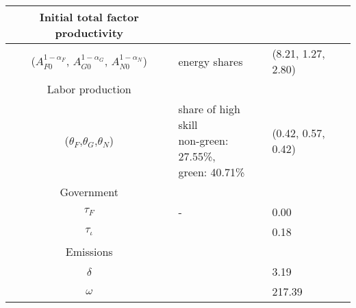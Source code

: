 \begin{table}[h!]
\begin{center}
{\begin{tabular}{c|ll}
 			\hline
 			Initial total factor productivity&\multicolumn{2}{c}{}\\
 			\hline
 			($A_{F0}^{1-\alpha_F}$, $A_{G0}^{1-\alpha_G}$, $A_{N0}^{1-\alpha_N}$)& energy shares \citep{EIAEnergy} &(8.21, 1.27, 2.80)  \\
 			\hline 
 				Labor production&\multicolumn{2}{c}{}\\ 			
 			\hline
 			($\theta_F$,$\theta_G$,$\theta_N$)&\makecell[l]{share of high skill\\ non-green: 27.55\%,\\ green: 40.71\% \citep{Consoli2016DoCapital} }& (0.42, 0.57, 0.42)\\
 			\hline
 			Government&\multicolumn{2}{c}{}\\
 			\hline
 			$\tau_F$&- &0.00\\
 			$\tau_{\iota}$&\cite{Heathcote2017OptimalFramework} &0.18\\
 			\hline
 			Emissions&\multicolumn{2}{c}{}\\
 			\hline
 			$\delta$& \makecell[l]{\cite{EPAems}}&3.19\\
 			$\omega$& \cite{EPAems}&217.39\\
 			\hline \hline
 		\end{tabular}	}
 	\end{center}
 \end{table}
 
 
 
 




